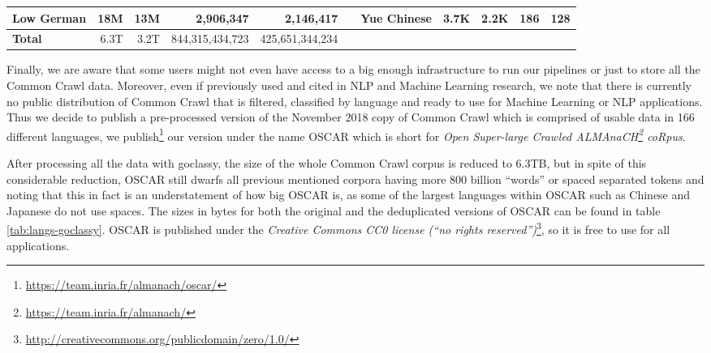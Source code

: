 \begin{table*}[t!]
{\begin{tabular}{@{}lrrrrclrrrr@{}}
            Low German                & 18M                      & 13M                       & 2,906,347                & 2,146,417                 &                          & Yue Chinese               & 3.7K                     & 2.2K                      & 186                      & 128                       \\
            \midrule
            \textbf{Total}            & 6.3T                     & 3.2T                      & 844,315,434,723          & 425,651,344,234           &                          &                           &                          &                           &                          &                           \\
            \bottomrule
        \end{tabular}
    }
    \caption{Size of the OSCAR corpus by language measured in bytes and number of words. Standard UNIX human-readable notation is used for the size in byte. We define ``words'' as spaced separated tokens, which gives a good estimate of the size of each corpus for languages using Latin or Cyrillic alphabets, but might give a misleading size for other languages such as Chinese or Japanese.}
    \label{tab:langs-goclassy}
\end{table*}

Finally, we are aware that some users might not even have access to a big enough infrastructure to run our pipelines or just to store all the Common Crawl data. Moreover, even if previously used and cited in NLP and Machine Learning research, we note that there is currently no public distribution of Common Crawl that is filtered, classified by language and ready to use for Machine Learning or NLP applications. Thus we decide to publish a pre-processed version of the November 2018 copy of Common Crawl which is comprised of usable data in 166 different languages, we publish\footnote{\url{https://team.inria.fr/almanach/oscar/}} our version under the name OSCAR which is short for \emph{Open Super-large Crawled ALMAnaCH\footnote{\url{https://team.inria.fr/almanach/}} coRpus}.

After processing all the data with goclassy, the size of the whole Common Crawl corpus is reduced to 6.3TB, but in spite of this considerable reduction, OSCAR still dwarfs all previous mentioned corpora having more 800 billion ``words'' or spaced separated tokens and noting that this in fact is an understatement of how big OSCAR is, as some of the largest languages within OSCAR such as Chinese and Japanese do not use spaces. The sizes in bytes for both the original and the deduplicated versions of OSCAR can be found in table \ref{tab:langs-goclassy}. OSCAR is published under the \emph{Creative Commons CC0 license (``no rights reserved'')}\footnote{\url{http://creativecommons.org/publicdomain/zero/1.0/}}, so it is free to use for all applications.

